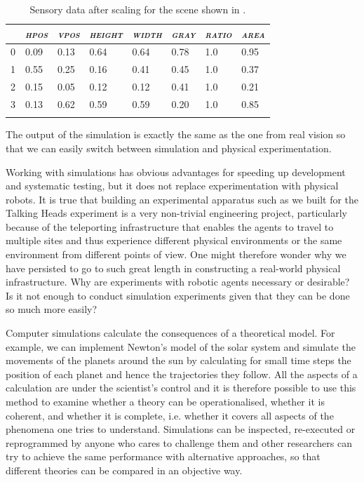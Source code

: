 \begin{table}[h]
\begin{center}
\begin{tabular}{  l   l   l   l   l   l   l   l  }
\lsptoprule
& {\itshape \textsc{hpos}} & {\itshape \textsc{vpos}} & {\itshape \textsc{height}} & {\itshape \textsc{width}} & {\itshape \textsc{gray}} & {\itshape \textsc{ratio}}  & {\itshape \textsc{area}} \\ \midrule
0 & 0.09 & 0.13 &  0.64 &  0.64 &  0.78 &  1.0 & 0.95 \\ 
1 & 0.55 & 0.25 & 0.16 & 0.41 & 0.45 & 1.0 & 0.37 \\ 
2 & 0.15 & 0.05 & 0.12 & 0.12 & 0.41 & 1.0 & 0.21 \\ 
3 & 0.13 & 0.62 & 0.59 & 0.59 & 0.20 & 1.0 & 0.85 \\ 
\lspbottomrule
\end{tabular}
\end{center}
\caption{\label{tab:t-geomscaled}Sensory data after scaling for the scene shown in .}
\end{table}

The output of the simulation is exactly the same as the one from real vision 
so that we can easily switch between simulation 
and physical experimentation. 


Working  with simulations has obvious advantages for 
speeding up development and systematic testing, 
but it does not replace experimentation with 
physical robots. It is true that 
building an experimental apparatus such as we built
for the Talking Heads experiment is a very 
non-trivial engineering project, particularly because 
of the teleporting infrastructure that enables the agents 
to travel to multiple sites and thus 
experience different physical environments or the same 
environment from different points of view. 
One might therefore wonder why we have persisted
to go to such great length in constructing
a real-world physical infrastructure. Why are
experiments with robotic agents necessary or 
desirable? Is it not enough to conduct simulation
experiments given that they can be done so much 
more easily? 

Computer simulations calculate the consequences of a
theoretical model. For example, we can implement Newton's
model of the solar system and simulate the movements
of the planets around the sun by calculating for 
small time steps the position of each planet and hence
the trajectories they follow. All the aspects of 
a calculation are under the scientist's control and it 
is therefore possible to use this method to examine whether a theory can 
be operationalised, whether it is coherent, and whether 
it is complete, i.e. whether it covers all 
aspects of the phenomena one tries to understand. 
Simulations can be inspected, re-executed
or reprogrammed by anyone who cares to challenge them and
other researchers can try to achieve the
same performance with alternative approaches, so that 
different theories can be compared in an objective way. 

